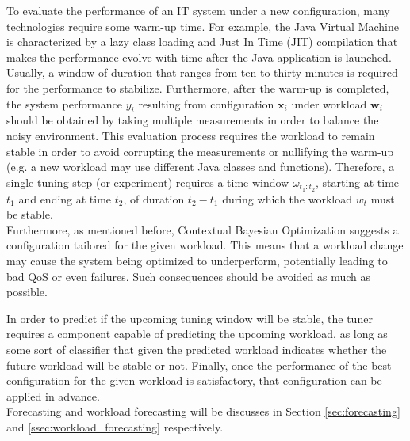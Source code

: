 \documentclass[a4paper, 12pt]{article} %
\begin{document}
	To evaluate the performance of an IT system under a new configuration, many technologies require some warm-up time. For example, the Java Virtual Machine is characterized by a lazy class loading and Just In Time (JIT) compilation that makes the performance evolve with time after the Java application is launched. Usually, a window of duration that ranges from ten to thirty minutes is required for the performance to stabilize. Furthermore, after the warm-up is completed, the system performance $y_i$ resulting from configuration $\pmb{x}_i$ under workload $\pmb{w}_i$ should be obtained by taking multiple measurements in order to balance the noisy environment. This evaluation process requires the workload to remain stable in order to avoid corrupting the measurements or nullifying the warm-up (e.g. a new workload may use different Java classes and functions). Therefore, a single tuning step (or experiment) requires a time window $\omega_{t_1:t_2}$, starting at time $t_1$ and ending at time $t_2$, of duration $t_2 - t_1$ during which the workload $w_t$ must be stable.\\
	Furthermore, as mentioned before, Contextual Bayesian Optimization suggests a configuration tailored for the given workload.  This means that a workload change may cause the system being optimized to underperform, potentially leading to bad QoS or even failures. Such consequences should be avoided as much as possible.
	
	In order to predict if the upcoming tuning window will be stable, the tuner requires a component capable of predicting the upcoming workload, as long as some sort of classifier that given the predicted workload indicates whether the future workload will be stable or not.
	Finally, once the performance of the best configuration for the given workload is satisfactory, that configuration can be applied in advance.\\
	Forecasting and workload forecasting will be discusses in Section \ref{sec:forecasting} and \ref{ssec:workload_forecasting} respectively.
	
\end{document}
